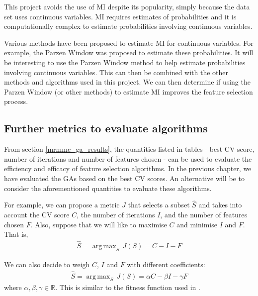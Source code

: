 \documentclass[12pt, twoside, a4paper]{report}
\DeclareMathOperator*{\argmax}{arg\,max}
\begin{document}
This project avoids the use of MI despite its popularity, simply because the data set uses continuous variables. MI requires estimates of probabilities and it is computationally complex to estimate probabilities involving continuous variables.

Various methods have been proposed to estimate MI for continuous variables. For example, the Parzen Window \cite{RefWorks:183} was proposed to estimate these probabilities. It will be interesting to use the Parzen Window method to help estimate probabilities involving continuous variables. This can then be combined with the other methods and algorithms used in this project. We can then determine if using the Parzen Window (or other methods) to estimate MI improves the feature selection process.

\subsection{Further metrics to evaluate algorithms}

From section \ref{mrmmc_ga_results}, the quantities listed in tables - best CV score, number of iterations and number of features chosen - can be used to evaluate the efficiency and efficacy of feature selection algorithms. In the previous chapter, we have evaluated the GAs based on the best CV scores. An alternative will be to consider the aforementioned quantities to evaluate these algorithms.

For example, we can propose a metric $J$ that selects a subset $\widehat{S}$ and takes into account the CV score $C$, the number of iterations $I$, and the number of features chosen $F$. Also, suppose that we will like to maximise $C$ and minimise $I$ and $F$. That is,
\begin{align*}
\widehat{S} = \argmax_{S} \, J(S) = C - I - F
\end{align*}

We can also decide to weigh $C$, $I$ and $F$ with different coefficients:
\begin{align*}
\widehat{S} = \argmax_{S} \, J(S) = \alpha C - \beta I - \gamma F
\end{align*}
where $\alpha, \beta, \gamma \in \mathbb{R}$. This is similar to the fitness function used in \cite{RefWorks:199}.

\newpage

\singlespacing
{}



\end{document}
